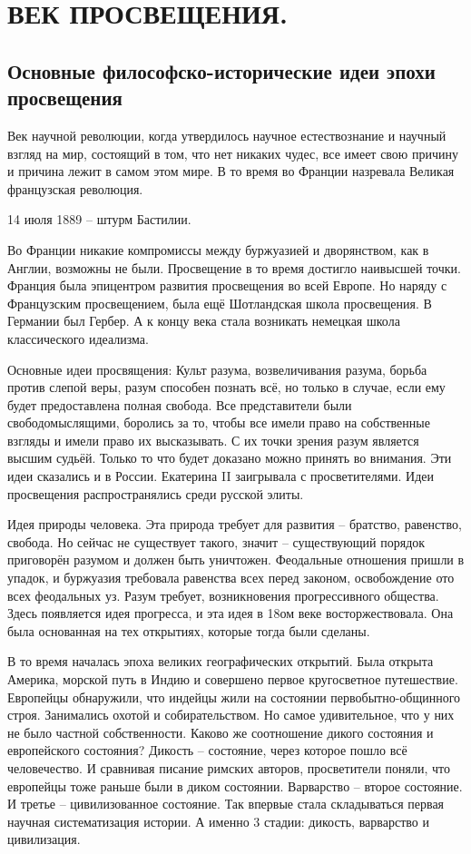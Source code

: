 \section{ВЕК ПРОСВЕЩЕНИЯ.}
\subsection{Основные философско-исторические идеи эпохи просвещения}

Век научной революции, когда утвердилось научное естествознание и научный взгляд на мир, состоящий в том, что нет никаких чудес, все имеет свою причину и причина лежит в самом этом мире. В то время во Франции назревала Великая французская революция.

14 июля 1889 – штурм Бастилии.

Во Франции никакие компромиссы между буржуазией и дворянством, как в Англии, возможны не были. Просвещение в то время достигло наивысшей точки. Франция была эпицентром развития просвещения во всей Европе. Но наряду с Французским просвещением, была ещё Шотландская школа просвещения. В Германии был Гербер. А к концу века стала возникать немецкая школа классического идеализма.

    Основные идеи просвящения: Культ разума, возвеличивания разума, борьба против слепой веры, разум способен познать всё, но только в случае, если ему будет предоставлена полная свобода. Все представители были свободомыслящими, боролись за то, чтобы все имели право на собственные взгляды и имели право их высказывать. С их точки зрения разум является высшим судьёй. Только то что будет доказано можно принять во внимания. Эти идеи сказались и в России. Екатерина II заигрывала с просветителями. Идеи просвещения распространялись среди русской элиты.

Идея природы человека. Эта природа требует для развития – братство, равенство, свобода. Но сейчас не существует такого, значит – существующий порядок приговорён разумом и должен быть уничтожен. Феодальные отношения пришли в упадок, и буржуазия требовала равенства всех перед законом, освобождение ото всех феодальных уз. Разум требует, возникновения прогрессивного общества. Здесь появляется идея прогресса, и эта идея в 18ом веке восторжествовала. Она была основанная на тех открытиях, которые тогда были сделаны.

В то время началась эпоха великих географических открытий. Была открыта Америка, морской путь в Индию и совершено первое кругосветное путешествие. Европейцы обнаружили, что индейцы жили на состоянии первобытно-общинного строя. Занимались охотой и собирательством. Но самое удивительное, что у них не было частной собственности. Каково же соотношение дикого состояния и европейского состояния? Дикость – состояние, через которое пошло всё человечество. И сравнивая писание римских авторов, просветители поняли, что европейцы тоже раньше были в диком состоянии. Варварство – второе состояние. И третье – цивилизованное состояние. Так впервые стала складываться первая научная систематизация истории. А именно 3 стадии: дикость, варварство и цивилизация.
